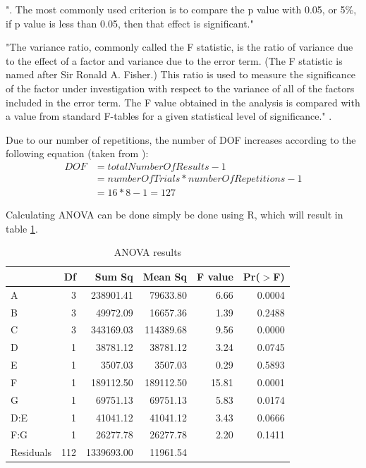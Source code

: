 ". The most commonly used criterion is to compare the p value with 0.05, or 5\%, if p value is less than 0.05, then that effect is significant."\cite{yang_design_2009}

"The variance ratio, commonly called the F statistic, is the ratio of variance due to the effect of a factor and variance due to the error term. (The F statistic is named after Sir Ronald A. Fisher.) This ratio is used to measure the significance of the factor under investigation with respect to the variance of all of the factors included in the error term. The F value obtained in the analysis is compared with a value from standard F-tables for a given statistical level of significance." \cite{roy_primer_1990}.


Due to our number of repetitions, the number of DOF increases according to the following equation (taken from \cite{roy_primer_1990}):
\begin{equation} \label{full DOF}
	\begin{split}
		DOF & = totalNumberOfResults - 1 \\
		& = numberOfTrials * numberOfRepetitions - 1 \\
		& = 16 * 8 - 1 = 127
	\end{split}
\end{equation}


Calculating ANOVA can be done simply be done using R, which will result in table \ref{table:taguchi:anova_results}.

\begin{table}[ht]
	\centering
	\begin{tabular}{lrrrrr}
		\hline
		& Df & Sum Sq & Mean Sq & F value & Pr($>$F) \\ 
		\hline
		A & 3 & 238901.41 & 79633.80 & 6.66 & 0.0004 \\ 
		B & 3 & 49972.09 & 16657.36 & 1.39 & 0.2488 \\ 
		C & 3 & 343169.03 & 114389.68 & 9.56 & 0.0000 \\ 
		D & 1 & 38781.12 & 38781.12 & 3.24 & 0.0745 \\ 
		E & 1 & 3507.03 & 3507.03 & 0.29 & 0.5893 \\ 
		F & 1 & 189112.50 & 189112.50 & 15.81 & 0.0001 \\ 
		G & 1 & 69751.13 & 69751.13 & 5.83 & 0.0174 \\ 
		D:E & 1 & 41041.12 & 41041.12 & 3.43 & 0.0666 \\ 
		F:G & 1 & 26277.78 & 26277.78 & 2.20 & 0.1411 \\ 
		Residuals & 112 & 1339693.00 & 11961.54 &  &  \\ 
		\hline
	\end{tabular}
	\caption{ANOVA results}
	\label{table:taguchi:anova_results}
\end{table}

